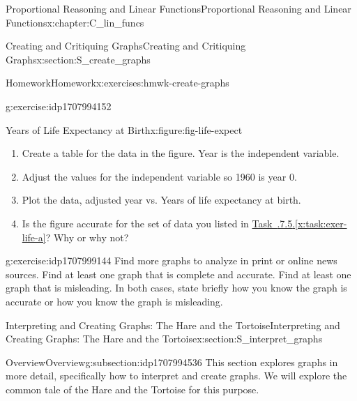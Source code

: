 \documentclass[oneside,10pt,]{book}
\newcommand{\xreffont}{\relax}
\numberwithin{equation}{chapter}
\begin{document}
\begin{chapterptx}{Proportional Reasoning and Linear Functions}{}{Proportional Reasoning and Linear Functions}{}{}{x:chapter:C_lin_funcs}
\begin{sectionptx}{Creating and Critiquing Graphs}{}{Creating and Critiquing Graphs}{}{}{x:section:S_create_graphs}
\begin{exercises-subsection}{Homework}{}{Homework}{}{}{x:exercises:hmwk-create-graphs}
\begin{divisionexercise}{5}{}{}{g:exercise:idp1707994152}
\begin{figureptx}{Years of Life Expectancy at Birth}{x:figure:fig-life-expect}{}
\begin{image}{0.25}{0.5}{0.25}
\end{image}%
\tcblower
\end{figureptx}%
\begin{enumerate}[font=\bfseries,label=(\alph*),ref=\alph*]
\item\label{x:task:exer-life-a}Create a table for the data in the figure. Year is the independent variable.%
\item{}Adjust the values for the independent variable so 1960 is year 0.%
\item{}Plot the data, adjusted year vs. Years of life expectancy at birth.%
\item{}Is the figure accurate for the set of data you listed in \hyperref[x:task:exer-life-a]{Task~{\xreffont 2.2.7.5}.{\xreffont\ref{x:task:exer-life-a}}}? Why or why not?%
\end{enumerate}
\end{divisionexercise}%
\begin{divisionexercise}{6}{}{}{g:exercise:idp1707999144}%
Find more graphs to analyze in print or online news sources. Find at least one graph that is complete and accurate. Find at least one graph that is misleading. In both cases, state briefly how you know the graph is accurate or how you know the graph is misleading.%
\end{divisionexercise}%
\end{exercises-subsection}
\end{sectionptx}
%
%
\typeout{************************************************}
\typeout{************************************************}
%
\begin{sectionptx}{Interpreting and Creating Graphs: The Hare and the Tortoise}{}{Interpreting and Creating Graphs: The Hare and the Tortoise}{}{}{x:section:S_interpret_graphs}
%
%
\typeout{************************************************}
\typeout{************************************************}
%
\begin{subsectionptx}{Overview}{}{Overview}{}{}{g:subsection:idp1707994536}
This section explores graphs in more detail, specifically how to interpret and create graphs. We will explore the common tale of the Hare and the Tortoise for this purpose.%
\end{subsectionptx}
%
%
\typeout{************************************************}
\typeout{************************************************}
%

\end{sectionptx}
\end{chapterptx}
\end{document}
